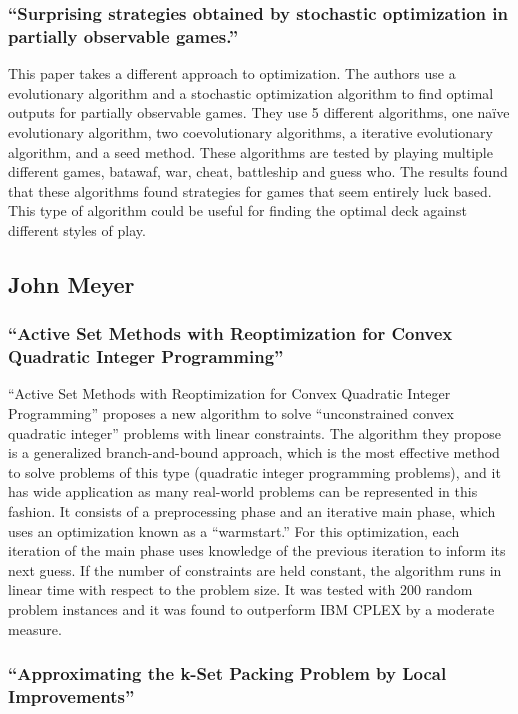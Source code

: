 \documentclass[12pt, letterpaper]{article}
\begin{document}
\subsubsection{\enquote{Surprising strategies obtained by stochastic optimization in partially observable games.}}

This paper takes a different approach to optimization. The authors use a evolutionary algorithm and a stochastic
optimization algorithm to find optimal outputs for partially observable games. They use 5 different algorithms, one
naïve evolutionary algorithm, two coevolutionary algorithms, a iterative evolutionary algorithm, and a seed method.
These algorithms are tested by playing multiple different games, batawaf, war, cheat, battleship and guess who. The
results found that these algorithms found strategies for games that seem entirely luck based. This type of algorithm
could be useful for finding the optimal deck against different styles of play.

\subsection{John Meyer}

\subsubsection{\enquote{Active Set Methods with Reoptimization for Convex Quadratic Integer Programming}}

\enquote{Active Set Methods with Reoptimization for Convex Quadratic Integer Programming}
proposes a new algorithm to solve \enquote{unconstrained convex quadratic integer}
problems with linear constraints.
The algorithm they propose is a generalized branch-and-bound approach,
which is the most effective method to solve problems of this type (quadratic integer programming problems),
and it has wide application as many real-world problems can be represented in this fashion.
It consists of a preprocessing phase and an iterative main phase,
which uses an optimization known as a \enquote{warmstart.}
For this optimization,
each iteration of the main phase uses knowledge of the previous iteration to inform its next guess.
If the number of constraints are held constant,
the algorithm runs in linear time with respect to the problem size.
It was tested with 200 random problem instances and it was found to outperform IBM CPLEX by a moderate measure.

\subsubsection{\enquote{Approximating the k-Set Packing Problem by Local Improvements}}
\end{document}

